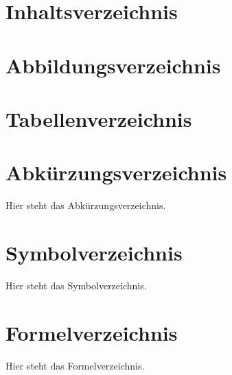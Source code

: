 \newpage
\pagestyle{empty}
\renewcommand{\contentsname}{} %
\section*{Inhaltsverzeichnis}
\vspace{-3cm} %
\tableofcontents
\newpage

\newpage
\pagestyle{empty}
\renewcommand{\listfigurename}{} %
\section*{Abbildungsverzeichnis}
\vspace{-1.5cm} %
\listoffigures
\newpage

\newpage
\pagestyle{empty}
\renewcommand{\listtablename}{} %
\section*{Tabellenverzeichnis}
\vspace{-1.5cm} %
\listoftables
\newpage

\newpage
\pagestyle{fancy} %
\fancyhead{}
\renewcommand{\headrulewidth}{0pt}  %
\section*{Abkürzungsverzeichnis}
Hier steht das Abkürzungsverzeichnis.

\newpage
{}
\section*{Symbolverzeichnis}
Hier steht das Symbolverzeichnis.

\newpage
{}
\section*{Formelverzeichnis}
Hier steht das Formelverzeichnis.
